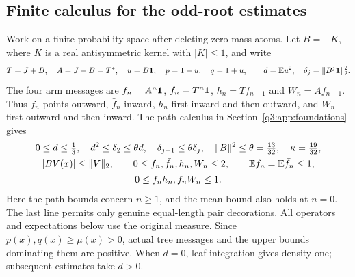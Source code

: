 \subsection{Finite calculus for the odd-root estimates}
\label{sec:odd-common-calculus}

Work on a finite probability space after deleting zero-mass atoms. Let
\(B=-K\), where \(K\) is a real antisymmetric kernel with \(|K|\le1\),
and write
\[
 T=J+B,\quad A=J-B=T^*,\quad u=B\mathbf1,\quad p=1-u,\quad q=1+u,
 \qquad d=\mathbb E u^2,\quad \delta_j=\|B^j\mathbf1\|_2^2.
\]
The four arm messages are
\(f_n=A^n\mathbf1\), \(\bar f_n=T^n\mathbf1\),
\(h_n=Tf_{n-1}\) and \(W_n=A\bar f_{n-1}\).
Thus \(f_n\) points outward, \(\bar f_n\) inward, \(h_n\) first
inward and then outward, and \(W_n\) first outward and then inward.
The path calculus in Section~\ref{q3:app:foundations} gives
\begin{equation}\label{eq:odd-common:inputs}
\begin{gathered}
 0\le d\le\tfrac13,\quad d^2\le\delta_2\le\theta d,
 \quad\delta_{j+1}\le\theta\delta_j,
 \quad\|B\|^2\le\theta=\tfrac{13}{32},\quad\kappa=\tfrac{19}{32},\\
 |BV(x)|\le\|V\|_2,\qquad
 0\le f_n,\bar f_n,h_n,W_n\le2,\qquad
 \mathbb E f_n=\mathbb E\bar f_n\le1,\\
 0\le f_nh_n,\bar f_nW_n\le1.
\end{gathered}
\end{equation}
Here the path bounds concern \(n\ge1\), and the mean bound also holds
at \(n=0\). The last line permits only genuine equal-length pair
decorations. All operators and expectations below use the original
measure. Since \(p(x),q(x)\ge\mu(x)>0\), actual tree messages and the
upper bounds dominating them are positive. When \(d=0\), leaf
integration gives density one; subsequent estimates take \(d>0\).

